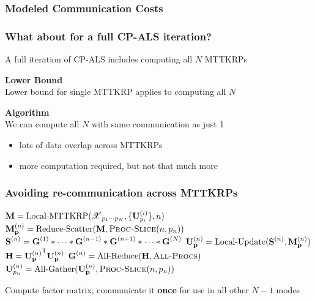 \documentclass[xcolor=dvipsnames]{beamer}
\begin{document}
\begin{frame}
\frametitle{Modeled Communication Costs}

\begin{center}

\end{center}

\end{frame}

\begin{frame}
\frametitle{What about for a full CP-ALS iteration?}

A full iteration of CP-ALS includes computing all $N$ MTTKRPs

\vfill

\textbf{Lower Bound}\\
Lower bound for single MTTKRP applies to computing all $N$

\vfill

\textbf{Algorithm}\\
We can compute all $N$ with same communication as just 1
\begin{itemize}
	\small
	\item lots of data overlap across MTTKRPs
	\item more computation required, but not that much more
\end{itemize}

\end{frame}

\begin{frame}
\frametitle{Avoiding re-communication across MTTKRPs}

\begin{algorithmic}
		\State {}
		\State \textcolor{wfugold}{$\M{M} = \text{Local-MTTKRP}(\T{X}_{p_1\cdots p_N},\{\Mn{U}{i}_{p_i}\},n)$}
		\State \textcolor{wfugold}{$\Mn{M}{n}_{\V{p}} = \text{Reduce-Scatter}(\M{M},\textsc{Proc-Slice}(n,\VE{p}{n}))$} 
		\State \textcolor{gray}{$\Mn{S}{n} = \Mn{G}{1} \Hada \cdots \Hada \Mn{G}{n-1} \Hada \Mn{G}{n+1} \Hada \cdots \Hada \Mn{G}{N}$}
		\State \textcolor{gray}{$\Mn{U}{n}_{\V{p}} = \text{Local-Update}(\Mn{S}{n},\Mn{M}{n}_{\V{p}})$}
		\State {}
		\State \textcolor{gray}{$\M{H} = {\Mn{U}{n}_{\V{p}}}^\Tra\Mn{U}{n}_{\V{p}}$}
		\State \textcolor{gray}{$\Mn{G}{n} = \text{All-Reduce}(\M{H},\textsc{All-Procs})$}
		\State \textcolor{wfugold}{$\Mn{U}{n}_{p_n} = \text{All-Gather}(\Mn{U}{n}_{\V{p}},\textsc{Proc-Slice}(n,\VE{p}{n}))$}
	\EndFor 
\EndWhile
\end{algorithmic}

\vfill

\begin{center}
\footnotesize
Compute factor matrix, communicate it \textbf{once} for use in all other $N{-}1$ modes
\end{center}

\end{frame}
\end{document}
